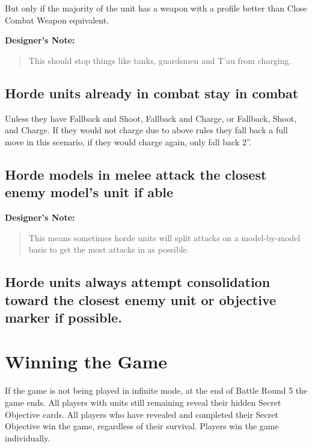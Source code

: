 \documentclass{HordeModeTarot}
\begin{document}
But only if the majority of the unit has a weapon with a profile better than Close Combat Weapon equivalent.

\textbf{Designer's Note:}

\begin{quote}
This should stop things like tanks, guardsmen and T'au from charging.
\end{quote}

\subsection*{Horde units already in combat stay in combat}

Unless they have Fallback and Shoot, Fallback and Charge, or Fallback, Shoot, and Charge. If they would not charge due to above rules they fall back a full move in this scenario, if they would charge again, only fall back 2”.

\subsection*{Horde models in melee attack the closest enemy model's unit if able}

\textbf{Designer's Note:}

\begin{quote}
This means sometimes horde units will split attacks on a model-by-model basis to get the most attacks in as possible.
\end{quote}

\subsection*{Horde units always attempt consolidation toward the closest enemy unit or objective marker if possible.}

\section{Winning the Game}\hypertarget{winning-the-game}{}\label{winning-the-game}

If the game is not being played in infinite mode, at the end of Battle Round 5 the game ends. All players with units still remaining reveal their hidden Secret Objective cards. All players who have revealed and completed their Secret Objective win the game, regardless of their survival. Players win the game individually.
\end{document}
